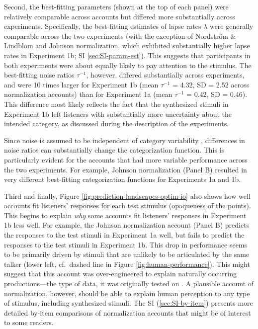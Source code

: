 \documentclass[preprint]{JASA}
\begin{document}
Second, the best-fitting parameters (shown at the top of each panel) were relatively comparable across accounts but differed more substantially across experiments. Specifically, the best-fitting estimates of lapse rates \(\lambda\) were generally comparable across the two experiments (with the exception of Nordström \& Lindblom and Johnson normalization, which exhibited substantially higher lapse rates in Experiment 1b; SI \ref{sec:SI-param-est}). This suggests that participants in both experiments were about equally likely to pay attention to the stimulus. The best-fitting noise ratios \(\tau^{-1}\), however, differed substantially across experiments, and were 10 times larger for Experiment 1b (mean \(\tau^{-1}\) = 4.32, SD = 2.52 across normalization accounts) than for Experiment 1a (mean \(\tau^{-1}\) = 0.42, SD = 0.46). This difference most likely reflects the fact that the synthesized stimuli in Experiment 1b left listeners with substantially more uncertainty about the intended category, as discussed during the description of the experiments.

Since noise is assumed to be independent of category variability \citep[see also][]{feldman2009, kronrod2016}, differences in noise ratios can substantially change the categorization function. This is particularly evident for the accounts that had more variable performance across the two experiments. For example, Johnson normalization (Panel B) resulted in very different best-fitting categorization functions for Experiments 1a and 1b.

Third and finally, Figure \ref{fig:prediction-landscapes-optim-io} also shows how well accounts fit listeners' responses for each test stimulus (opaqueness of the points). This begins to explain \emph{why} some accounts fit listeners' responses in Experiment 1b less well. For example, the Johnson normalization account (Panel B) predicts the responses to the test stimuli in Experiment 1a well, but fails to predict the responses to the test stimuli in Experiment 1b. This drop in performance seems to be primarily driven by stimuli that are unlikely to be articulated by the same talker (lower left, cf.~dashed line in Figure \ref{fig:human-performance}). This might suggest that this account was over-engineered to explain naturally occurring productions---the type of data, it was originally tested on \citep{johnson2020}. A plausible account of normalization, however, should be able to explain human perception to any type of stimulus, including synthesized stimuli. The SI (\ref{sec:SI-by-item}) presents more detailed by-item comparisons of normalization accounts that might be of interest to some readers.
\end{document}
